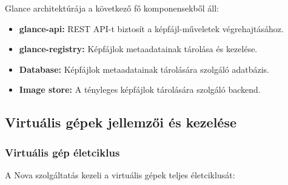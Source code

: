 \documentclass[a4paper,12pt]{article}
\begin{document}
    Glance architektúrája a következő fő komponensekből áll:

    \begin{itemize}
        \item \textbf{glance-api:} REST API-t biztosít a képfájl-műveletek végrehajtásához.
        \item \textbf{glance-registry:} Képfájlok metaadatainak tárolása és kezelése.
        \item \textbf{Database:} Képfájlok metaadatainak tárolására szolgáló adatbázis.
        \item \textbf{Image store:} A tényleges képfájlok tárolására szolgáló backend.
    \end{itemize}

    \subsection{Virtuális gépek jellemzői és kezelése}

    \subsubsection{Virtuális gép életciklus}

    A Nova szolgáltatás kezeli a virtuális gépek teljes életciklusát:
\end{document}
